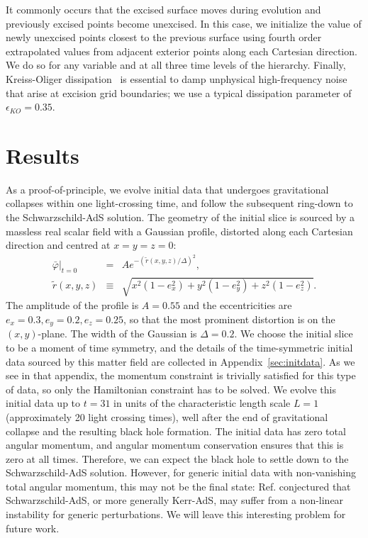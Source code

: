 \documentclass[a4paper,11pt]{article}
\numberwithin{equation}{section}
\begin{document}
It commonly occurs that the excised surface moves during evolution and previously excised points become unexcised. In this case, we initialize the value of newly unexcised points closest to the previous surface using fourth order extrapolated values from adjacent exterior points along each Cartesian direction. We do so for any variable and at all three time levels of the hierarchy.
Finally, Kreiss-Oliger dissipation~\cite{kreiss1973methods} is essential to damp unphysical high-frequency noise that arise at excision grid boundaries; we use a typical dissipation parameter of $\epsilon_{KO}=0.35$.



\section{Results}\label{sec:results}

As a proof-of-principle, we evolve initial data that undergoes gravitational collapses within one light-crossing time, and follow the subsequent ring-down to the Schwarzschild-AdS solution.
The geometry of the initial slice is sourced by a massless real scalar field with a Gaussian profile, distorted along each Cartesian direction and centred at $x=y=z=0$:
\begin{eqnarray}
\label{eq:scaGaupro}
\bar{\varphi}|_{t=0}&=&A e^{-(\tilde{r}(x,y,z)/\Delta)^2},\\
\tilde{r}(x,y,z)&\equiv&\sqrt{ x^2(1-e_x^2)+ y^2(1-e_y^2)+ z^2(1-e_z^2)}. \nonumber
\end{eqnarray}
The amplitude of the profile is $A=0.55$ and the eccentricities are $e_x=0.3, e_y=0.2, e_z=0.25$, so that the most prominent distortion is on the $(x,y)$-plane. The width of the Gaussian is $\Delta=0.2$. 
We choose the initial slice to be a moment of time symmetry, and the details of the time-symmetric initial data sourced by this matter field are collected in Appendix~\ref{sec:initdata}. 
As we see in that appendix, the momentum constraint is trivially satisfied for this type of data, so only the Hamiltonian constraint has to be solved. We evolve this initial data up to $t=31$ in units of the characteristic length scale $L=1$ (approximately 20 light crossing times), well after the end of gravitational collapse and the resulting black hole formation. 
The initial data has zero total angular momentum, 
and angular momentum conservation \cite{Fischetti:2012rd} ensures that this is zero at all times. 
Therefore, we can expect the black hole to settle down to the Schwarzschild-AdS solution. However, for generic initial data with non-vanishing total angular momentum, this may not be the final state: Ref. \cite{Holzegel:2011uu} conjectured that Schwarzschild-AdS, or more generally Kerr-AdS, may suffer from a non-linear instability for generic perturbations.
We will leave this interesting problem for future work.
\end{document}
